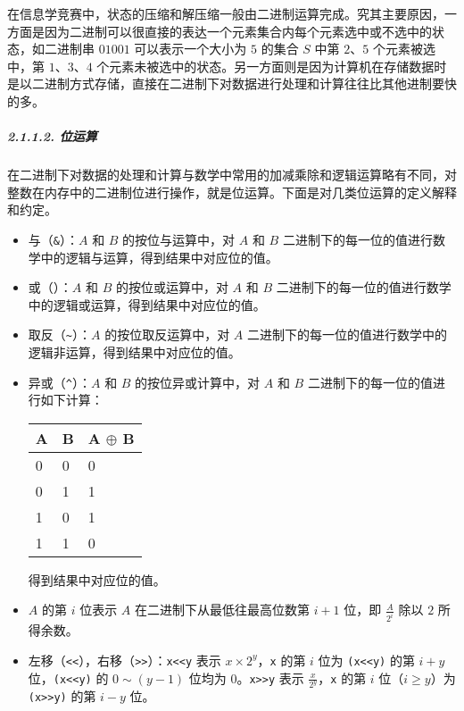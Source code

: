在信息学竞赛中，状态的压缩和解压缩一般由二进制运算完成。究其主要原因，一方面是因为二进制可以很直接的表达一个元素集合内每个元素选中或不选中的状态，如二进制串
\(01001\) 可以表示一个大小为 \(5\) 的集合 \(S\) 中第 \(2\)、\(5\)
个元素被选中，第 \(1\)、\(3\)、\(4\)
个元素未被选中的状态。另一方面则是因为计算机在存储数据时是以二进制方式存储，直接在二进制下对数据进行处理和计算往往比其他进制要快的多。

\subparagraph{2.1.1.2. 位运算}

在二进制下对数据的处理和计算与数学中常用的加减乘除和逻辑运算略有不同，对整数在内存中的二进制位进行操作，就是位运算。下面是对几类位运算的定义解释和约定。

\begin{itemize}
\item
  与（\texttt{\&}）：\(A\) 和 \(B\) 的按位与运算中，对 \(A\) 和 \(B\)
  二进制下的每一位的值进行数学中的逻辑与运算，得到结果中对应位的值。
\item
  或（\texttt{\textbar{}}）：\(A\) 和 \(B\) 的按位或运算中，对 \(A\) 和
  \(B\)
  二进制下的每一位的值进行数学中的逻辑或运算，得到结果中对应位的值。
\item
  取反（\texttt{\textasciitilde{}}）：\(A\) 的按位取反运算中，对 \(A\)
  二进制下的每一位的值进行数学中的逻辑非运算，得到结果中对应位的值。
\item
  异或（\texttt{\^{}}）：\(A\) 和 \(B\) 的按位异或计算中，对 \(A\) 和
  \(B\) 二进制下的每一位的值进行如下计算：

  \begin{longtable}[]{@{}lll@{}}
  \toprule
  A & B & A \(\oplus\) B \\
  \midrule
  \endhead
  0 & 0 & 0 \\
  0 & 1 & 1 \\
  1 & 0 & 1 \\
  1 & 1 & 0 \\
  \bottomrule
  \end{longtable}

  得到结果中对应位的值。
\item
  \(A\) 的第 \(i\) 位表示 \(A\) 在二进制下从最低往最高位数第 \(i+1\)
  位，即 \(\frac{A}{2^i}\) 除以 \(2\) 所得余数。
\item
  左移（\texttt{\textless{}\textless{}}），右移（\texttt{\textgreater{}\textgreater{}}）：\texttt{x\textless{}\textless{}y}
  表示 \(x\times 2^y\)，\texttt{x} 的第 \(i\) 位为
  \texttt{(x\textless{}\textless{}y)} 的第 \(i+y\)
  位，\texttt{(x\textless{}\textless{}y)} 的 \(0\sim (y-1)\) 位均为
  \(0\)。\texttt{x\textgreater{}\textgreater{}y} 表示
  \(\frac{x}{2^y}\)，\texttt{x} 的第 \(i\) 位（\(i\ge y\)）为
  \texttt{(x\textgreater{}\textgreater{}y)} 的第 \(i-y\) 位。
\end{itemize}

